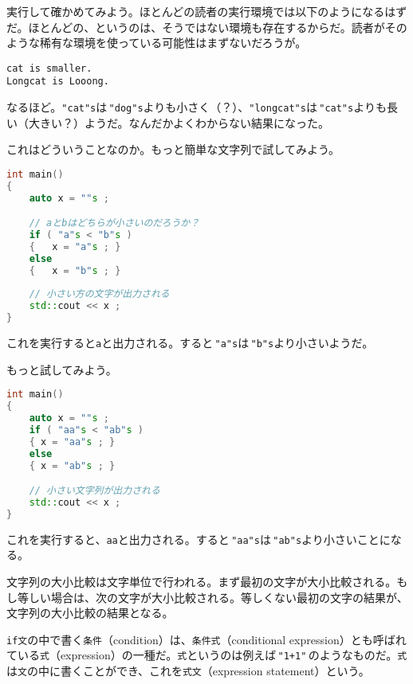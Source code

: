 実行して確かめてみよう。ほとんどの読者の実行環境では以下のようになるはずだ。ほとんどの、というのは、そうではない環境も存在するからだ。読者がそのような稀有な環境を使っている可能性はまずないだろうが。

\begin{lstlisting}[style=terminal]
cat is smaller.
Longcat is Looong.
\end{lstlisting}

なるほど。\texttt{"cat"s}は\,\texttt{"dog"s}よりも小さく（？）、\texttt{"longcat"s}は\,\texttt{"cat"s}よりも長い（大きい？）ようだ。なんだかよくわからない結果になった。

これはどういうことなのか。もっと簡単な文字列で試してみよう。

\begin{lstlisting}[language={C++}]
int main()
{
    auto x = ""s ;

    // aとbはどちらが小さいのだろうか？
    if ( "a"s < "b"s )
    {   x = "a"s ; }
    else
    {   x = "b"s ; }
 
    // 小さい方の文字が出力される
    std::cout << x ;
}
\end{lstlisting}

これを実行すると\texttt{a}と出力される。すると\,\texttt{"a"s}は\,\texttt{"b"s}より小さいようだ。

もっと試してみよう。

\begin{lstlisting}[language={C++}]
int main()
{
    auto x = ""s ;
    if ( "aa"s < "ab"s )
    { x = "aa"s ; }
    else
    { x = "ab"s ; }

    // 小さい文字列が出力される
    std::cout << x ;
}
\end{lstlisting}

これを実行すると、\texttt{aa}と出力される。すると\,\texttt{"aa"s}は\,\texttt{"ab"s}より小さいことになる。

文字列の大小比較は文字単位で行われる。まず最初の文字が大小比較される。もし等しい場合は、次の文字が大小比較される。等しくない最初の文字の結果が、文字列の大小比較の結果となる。



\texttt{if文}の中で書く\texttt{条件}（condition）は、\texttt{条件式}（conditional expression）とも呼ばれている\texttt{式}（expression）の一種だ。\texttt{式}というのは例えば\,\texttt{"1+1"}\,のようなものだ。\texttt{式}は\texttt{文}の中に書くことができ、これを\texttt{式文}（expression statement）という。

